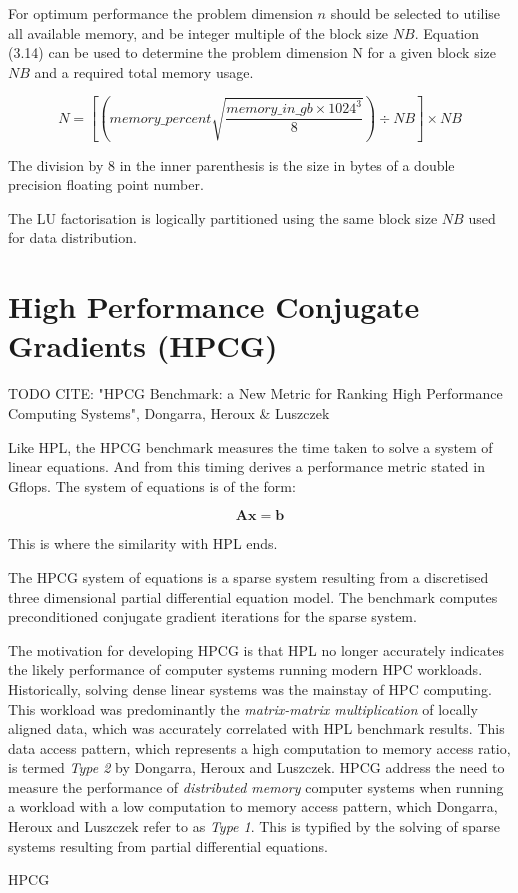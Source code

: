 For optimum performance the problem dimension $n$ should be selected to utilise all available memory, and be integer multiple of the block size $NB$. Equation (3.14) can be used to determine the problem dimension N for a given block size $NB$ and a required total memory usage.

\begin{equation}
N = \left[\left(memory\_percent \sqrt{\frac{memory\_in\_gb \times 1024^3}{8}}\right) \div NB\right] \times NB
\end{equation}

The division by 8 in the inner parenthesis is the size in bytes of a double precision floating point number.

The LU factorisation is logically partitioned using the same block size $NB$ used for data distribution.


%
%
\section{High Performance Conjugate Gradients (HPCG)}

TODO CITE: "HPCG Benchmark: a New Metric for Ranking High Performance Computing Systems", Dongarra, Heroux \& Luszczek

Like HPL, the HPCG benchmark measures the time taken to solve a system of linear equations. And from this timing derives a performance metric stated in Gflops. The system of equations is of the form:

\begin{equation}
\mathbf{Ax} = \mathbf{b}
\end{equation}

This is where the similarity with HPL ends.

The HPCG system of equations is a sparse system resulting from a discretised three dimensional partial differential equation model. The benchmark computes preconditioned conjugate gradient iterations for the sparse system.

The motivation for developing HPCG is that HPL no longer accurately indicates the likely performance of computer systems running modern HPC workloads. Historically, solving dense linear systems was the mainstay of HPC computing. This workload was predominantly the \emph{matrix-matrix multiplication} of locally aligned data, which was accurately correlated with HPL benchmark results. This data access pattern, which represents a high computation to memory access ratio, is termed \emph{Type 2} by Dongarra, Heroux and Luszczek. HPCG address the need to measure the performance of \emph{distributed memory} computer systems when running a workload with a low computation to memory access pattern, which Dongarra, Heroux and Luszczek refer to as \emph{Type 1}. This is typified by the solving of sparse systems resulting from partial differential equations.

HPCG 

   






